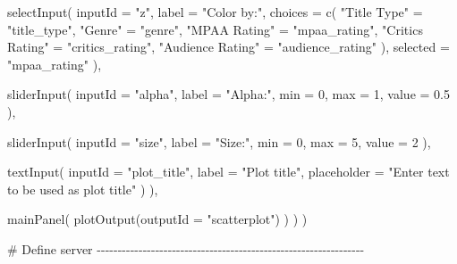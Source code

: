 \documentclass[
  letterpaper,
  DIV=11,
  numbers=noendperiod]{scrreprt}
\newenvironment{Shaded}{\begin{snugshade}}{\end{snugshade}}
\newcommand{\AttributeTok}[1]{\textcolor[rgb]{0.40,0.46,0.14}{#1}}
\newcommand{\CommentTok}[1]{\textcolor[rgb]{0.37,0.37,0.37}{#1}}
\newcommand{\DecValTok}[1]{\textcolor[rgb]{0.68,0.00,0.00}{#1}}
\newcommand{\FloatTok}[1]{\textcolor[rgb]{0.68,0.00,0.00}{#1}}
\newcommand{\FunctionTok}[1]{\textcolor[rgb]{0.28,0.35,0.67}{#1}}
\newcommand{\NormalTok}[1]{\textcolor[rgb]{0.00,0.46,0.62}{#1}}
\newcommand{\OtherTok}[1]{\textcolor[rgb]{0.00,0.46,0.62}{#1}}
\newcommand{\StringTok}[1]{\textcolor[rgb]{0.13,0.47,0.30}{#1}}
\begin{document}
\begin{Shaded}
\begin{Highlighting}[]
      \FunctionTok{selectInput}\NormalTok{(}
        \AttributeTok{inputId =} \StringTok{"z"}\NormalTok{,}
        \AttributeTok{label =} \StringTok{"Color by:"}\NormalTok{,}
        \AttributeTok{choices =} \FunctionTok{c}\NormalTok{(}
          \StringTok{"Title Type"} \OtherTok{=} \StringTok{"title\_type"}\NormalTok{,}
          \StringTok{"Genre"} \OtherTok{=} \StringTok{"genre"}\NormalTok{,}
          \StringTok{"MPAA Rating"} \OtherTok{=} \StringTok{"mpaa\_rating"}\NormalTok{,}
          \StringTok{"Critics Rating"} \OtherTok{=} \StringTok{"critics\_rating"}\NormalTok{,}
          \StringTok{"Audience Rating"} \OtherTok{=} \StringTok{"audience\_rating"}
\NormalTok{        ),}
        \AttributeTok{selected =} \StringTok{"mpaa\_rating"}
\NormalTok{      ),}

      \FunctionTok{sliderInput}\NormalTok{(}
        \AttributeTok{inputId =} \StringTok{"alpha"}\NormalTok{,}
        \AttributeTok{label =} \StringTok{"Alpha:"}\NormalTok{,}
        \AttributeTok{min =} \DecValTok{0}\NormalTok{, }\AttributeTok{max =} \DecValTok{1}\NormalTok{,}
        \AttributeTok{value =} \FloatTok{0.5}
\NormalTok{      ),}

      \FunctionTok{sliderInput}\NormalTok{(}
        \AttributeTok{inputId =} \StringTok{"size"}\NormalTok{,}
        \AttributeTok{label =} \StringTok{"Size:"}\NormalTok{,}
        \AttributeTok{min =} \DecValTok{0}\NormalTok{, }\AttributeTok{max =} \DecValTok{5}\NormalTok{,}
        \AttributeTok{value =} \DecValTok{2}
\NormalTok{      ),}

      \FunctionTok{textInput}\NormalTok{(}
        \AttributeTok{inputId =} \StringTok{"plot\_title"}\NormalTok{,}
        \AttributeTok{label =} \StringTok{"Plot title"}\NormalTok{,}
        \AttributeTok{placeholder =} \StringTok{"Enter text to be used as plot title"}
\NormalTok{      )}
\NormalTok{    ),}

    \FunctionTok{mainPanel}\NormalTok{(}
      \FunctionTok{plotOutput}\NormalTok{(}\AttributeTok{outputId =} \StringTok{"scatterplot"}\NormalTok{)}
\NormalTok{    )}
\NormalTok{  )}
\NormalTok{)}

\CommentTok{\# Define server {-}{-}{-}{-}{-}{-}{-}{-}{-}{-}{-}{-}{-}{-}{-}{-}{-}{-}{-}{-}{-}{-}{-}{-}{-}{-}{-}{-}{-}{-}{-}{-}{-}{-}{-}{-}{-}{-}{-}{-}{-}{-}{-}{-}{-}{-}{-}{-}{-}{-}{-}{-}{-}{-}{-}{-}{-}{-}{-}{-}{-}{-}{-}{-}}


\end{Highlighting}
\end{Shaded}
\end{document}
